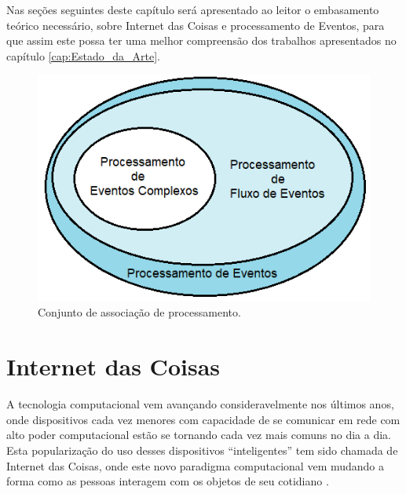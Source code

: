 \documentclass[ti,table]{texufpel} %
\begin{document}
  

Nas seções seguintes deste capítulo será apresentado ao leitor o embasamento teórico necessário, sobre Internet das Coisas e processamento de Eventos, para que assim este possa ter uma melhor compreensão dos trabalhos apresentados no capítulo \ref{cap:Estado_da_Arte}. 

  

  

\begin{figure}[ht] 

    \centering 

    \includegraphics[width=.6\textwidth]{imagens/ConjuntoProcessamento.png} 

    \caption{Conjunto de associação de processamento.} 

    \label{fig:ConjuntoProcessamento} 

\end{figure} 

  

  

\section{Internet das Coisas} 

  

A tecnologia computacional vem avançando consideravelmente nos últimos anos, onde dispositivos cada vez menores com capacidade de se comunicar em rede com alto poder computacional estão se tornando cada vez mais comuns no dia a dia. Esta popularização do uso desses dispositivos ``inteligentes'' tem sido chamada de Internet das Coisas, onde este novo paradigma computacional vem mudando a forma como as pessoas interagem com os objetos de seu cotidiano \cite{xavier2016smart}. 

  
\end{document}
